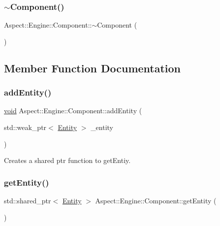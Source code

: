 \subsubsection{\texorpdfstring{$\sim$\+Component()}{~Component()}}
{\footnotesize\ttfamily Aspect\+::\+Engine\+::\+Component\+::$\sim$\+Component (\begin{DoxyParamCaption}{ }\end{DoxyParamCaption})\hspace{0.3cm}{\ttfamily [virtual]}}



\subsection{Member Function Documentation}
\mbox{\label{class_aspect_1_1_engine_1_1_component_accb4c932c2e93369ca168e1cd204ee31}} 
\subsubsection{\texorpdfstring{add\+Entity()}{addEntity()}}
{\footnotesize\ttfamily \mbox{\hyperlink{_s_d_l__opengles2__gl2ext_8h_ae5d8fa23ad07c48bb609509eae494c95}{void}} Aspect\+::\+Engine\+::\+Component\+::add\+Entity (\begin{DoxyParamCaption}\item[{std\+::weak\+\_\+ptr$<$ \mbox{\hyperlink{class_aspect_1_1_engine_1_1_entity}{Entity}} $>$}]{\+\_\+entity }\end{DoxyParamCaption})}



Creates a shared ptr function to get\+Entiy. 

\mbox{\label{class_aspect_1_1_engine_1_1_component_a1422571aabd1882f712e16ef4bf0cb77}} 
\subsubsection{\texorpdfstring{get\+Entity()}{getEntity()}}
{\footnotesize\ttfamily std\+::shared\+\_\+ptr$<$ \mbox{\hyperlink{class_aspect_1_1_engine_1_1_entity}{Entity}} $>$ Aspect\+::\+Engine\+::\+Component\+::get\+Entity (\begin{DoxyParamCaption}{ }\end{DoxyParamCaption})}



